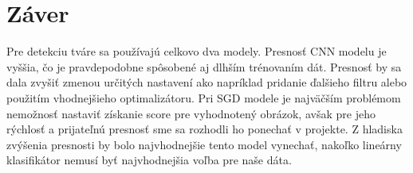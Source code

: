 \documentclass[11pt, a4paper]{article}
\begin{document}
\section{Záver}
	Pre detekciu tváre sa používajú celkovo dva modely. Presnosť CNN modelu je vyššia, čo je pravdepodobne spôsobené aj dlhším trénovaním dát. Presnosť by sa dala zvyšiť zmenou určitých nastavení ako napríklad pridanie ďalšieho filtru alebo použitím vhodnejšieho optimalizátoru. Pri SGD modele je najväčším problémom nemožnosť nastaviť získanie score pre vyhodnotený obrázok, avšak pre jeho rýchlosť a    prijateľnú presnosť sme sa rozhodli ho ponechať v projekte. Z hladiska zvýšenia presnosti by bolo najvhodnejšie tento model vynechať, nakoľko lineárny klasifikátor nemusí byť najvhodnejšia voľba pre naše dáta. 
\end{document}
